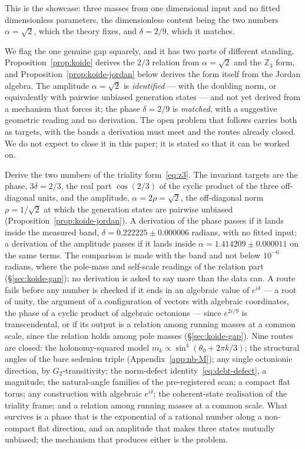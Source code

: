 This is the showcase: three masses from one dimensional input and no fitted dimensionless
parameters, the dimensionless content being the two numbers $\alpha=\sqrt2$, which the theory
fixes, and $\delta=2/9$, which it matches.

We flag the one genuine gap squarely, and it has two parts of different standing.
Proposition~\ref{prop:koide} derives the $2/3$ relation from $\alpha=\sqrt2$ and the
$\mathbb{Z}_3$ form, and Proposition~\ref{prop:koide-jordan} below derives the form itself from
the Jordan algebra. The amplitude $\alpha = \sqrt2$ is \emph{identified} --- with the doubling
norm, or equivalently with pairwise unbiased generation states --- and not yet derived from a
mechanism that forces it; the phase $\delta = 2/9$ is \emph{matched}, with a suggestive
geometric reading and no derivation. The open problem that follows carries both as targets, with
the bands a derivation must meet and the routes already closed. We do not expect to close it in
this paper; it is stated so that it can be worked on.

\begin{openproblem}\label{op:koide-delta}
Derive the two numbers of the triality form~\eqref{eq:z3}. The invariant targets are the phase,
$3\delta = 2/3$, the real part $\cos(2/3)$ of the cyclic product of the three off-diagonal
units, and the amplitude, $\alpha = 2\rho = \sqrt2$, the off-diagonal norm $\rho = 1/\sqrt2$ at
which the generation states are pairwise unbiased (Proposition~\ref{prop:koide-jordan}). A
derivation of the phase passes if it lands inside the measured band, $\delta = 0.222225 \pm
0.000006$ radians, with no fitted input; a derivation of the amplitude passes if it lands inside
$\alpha = 1.414209 \pm 0.000011$ on the same terms. The comparison is made with the band and not
below $10^{-6}$ radians, where the pole-mass and self-scale readings of the relation part
(\S\ref{sec:koide-gap}); no derivation is asked to say more than the data can. A route fails
before any number is checked if it ends in an algebraic value of $e^{i\delta}$ --- a root of
unity, the argument of a configuration of vectors with algebraic coordinates, the phase of a
cyclic product of algebraic octonions --- since $e^{2i/9}$ is transcendental, or if its output
is a relation among running masses at a common scale, since the relation holds among pole masses
(\S\ref{sec:koide-gap}). Nine routes are closed: the holonomy-squared model $m_k \propto
\sin^4(\theta_0 + 2\pi k/3)$; the structural angles of the bare sedenion triple
(Appendix~\ref{app:nb-M}); any single octonionic direction, by $G_2$-transitivity; the
norm-defect identity~\eqref{eq:debt-defect}, a magnitude; the natural-angle families of the
pre-registered scan; a compact flat torus; any construction with algebraic $e^{i\delta}$; the
coherent-state realisation of the triality frame; and a relation among running masses at a
common scale. What survives is a phase that is the exponential of a rational number along a
non-compact flat direction, and an amplitude that makes three states mutually unbiased; the
mechanism that produces either is the problem.
\end{openproblem}

